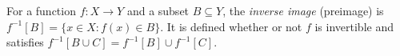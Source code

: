 
For a function $f:X\to Y$ and a subset $B\subseteq Y$, the \emph{inverse image} (preimage) is $f^{-1}[B]=\{x\in X:f(x)\in B\}$. It is defined whether or not $f$ is invertible and satisfies $f^{-1}[B\cup C]=f^{-1}[B]\cup f^{-1}[C]$.
